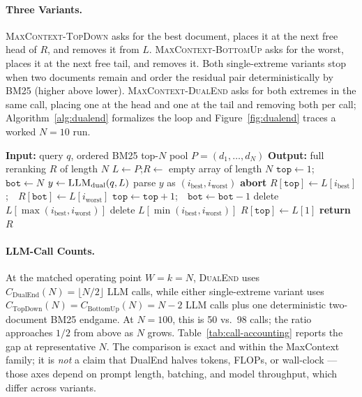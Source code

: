 \paragraph{Three Variants.}
\textsc{MaxContext-TopDown} asks for the best document, places it at the next free head of $R$, and removes it from $L$. \textsc{MaxContext-BottomUp} asks for the worst, places it at the next free tail, and removes it. Both single-extreme variants stop when two documents remain and order the residual pair deterministically by BM25 (higher above lower). \textsc{MaxContext-DualEnd} asks for both extremes in the same call, placing one at the head and one at the tail and removing both per call; Algorithm~\ref{alg:dualend} formalizes the loop and Figure~\ref{fig:dualend} traces a worked $N{=}10$ run.



\begin{algorithm}[t]
\small
\caption{\textsc{MaxContext-DualEnd}}
\label{alg:dualend}
\begin{algorithmic}[1]
\State \textbf{Input:} query $q$, ordered BM25 top-$N$ pool $P=(d_1,\ldots,d_N)$
\State \textbf{Output:} full reranking $R$ of length $N$
\State $L \gets P$;\quad $R \gets$ empty array of length $N$
\State $\texttt{top} \gets 1$; \ $\texttt{bot} \gets N$
  \State $y \gets \textsc{LLM}_{\mathrm{dual}}(q,L)$
  \State parse $y$ as $(i_{\mathrm{best}}, i_{\mathrm{worst}})$
    \State \textbf{abort}
  \EndIf
  \State $R[\texttt{top}] \gets L[i_{\mathrm{best}}]$;\ \ $R[\texttt{bot}] \gets L[i_{\mathrm{worst}}]$
  \State $\texttt{top} \gets \texttt{top}+1$;\ \ $\texttt{bot} \gets \texttt{bot}-1$
  \State delete $L[\max(i_{\mathrm{best}}, i_{\mathrm{worst}})]$
  \State delete $L[\min(i_{\mathrm{best}}, i_{\mathrm{worst}})]$
\EndWhile
{} \State $R[\texttt{top}] \gets L[1]$ \EndIf
\State \textbf{return} $R$
\end{algorithmic}
\end{algorithm}

\paragraph{LLM-Call Counts.}
At the matched operating point $W{=}k{=}N$, \textsc{DualEnd} uses $C_{\mathrm{DualEnd}}(N) = \lfloor N/2 \rfloor$ LLM calls, while either single-extreme variant uses $C_{\mathrm{TopDown}}(N) = C_{\mathrm{BottomUp}}(N) = N{-}2$ LLM calls plus one deterministic two-document BM25 endgame. At $N{=}100$, this is 50 vs.\ 98 calls; the ratio approaches $1/2$ from above as $N$ grows. Table~\ref{tab:call-accounting} reports the gap at representative $N$. The comparison is exact and within the MaxContext family; it is \emph{not} a claim that DualEnd halves tokens, FLOPs, or wall-clock --- those axes depend on prompt length, batching, and model throughput, which differ across variants.

